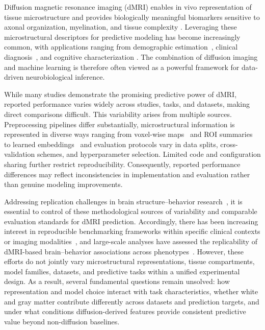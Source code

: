 
Diffusion magnetic resonance imaging (dMRI) enables in vivo representation of tissue microstructure and provides biologically meaningful biomarkers sensitive to axonal organization, myelination, and tissue complexity \cite{novikov2019quantifying}.
Leveraging these microstructural descriptors for predictive modeling has become increasingly common, with applications ranging from demographic estimation~\cite{chen2024deep,he2022model,chen2020generalization,de2018age,dibaji2024sex}, clinical diagnosis~\cite{egle2022prediction,wen2021reproducible}, and cognitive characterization \cite{kotikalapudi2025replicability,menon2020microstructural}.
The combination of diffusion imaging and machine learning is therefore often viewed as a powerful framework for data-driven neurobiological inference.


While many studies demonstrate the promising predictive power of dMRI, reported performance varies widely across studies, tasks, and datasets, making direct comparisons difficult.
This variability arises from multiple sources.
Preprocessing pipelines differ substantially, microstructural information is represented in diverse ways ranging from voxel-wise maps~\cite{chen2024deep} and ROI summaries~\cite{menon2020microstructural} to learned embeddings~\cite{chen2023deep,he2022model} and evaluation protocols vary in data splits, cross-validation schemes, and hyperparameter selection.
Limited code and configuration sharing further restrict reproducibility.
Consequently, reported performance differences may reflect inconsistencies in implementation and evaluation rather than genuine modeling improvements.

Addressing replication challenges in brain structure–behavior research~\cite{wu2023challenges,genon2022linking,rosenblatt2024power}, it is essential to control of these methodological sources of variability and comparable evaluation standards for dMRI prediction.
Accordingly, there has been increasing interest in reproducible benchmarking frameworks within specific clinical contexts or imaging modalities~\cite{wen2021reproducible}, and large-scale analyses have assessed the replicability of dMRI-based brain–behavior associations across phenotypes~\cite{rosenblatt2024power}.
However, these efforts do not jointly vary microstructural representations, tissue compartments, model families, datasets, and predictive tasks within a unified experimental design.
As a result, several fundamental questions remain unsolved: how representation and model choice interact with task characteristics, whether white and gray matter contribute differently across datasets and prediction targets, and under what conditions diffusion-derived features provide consistent predictive value beyond non-diffusion baselines.




